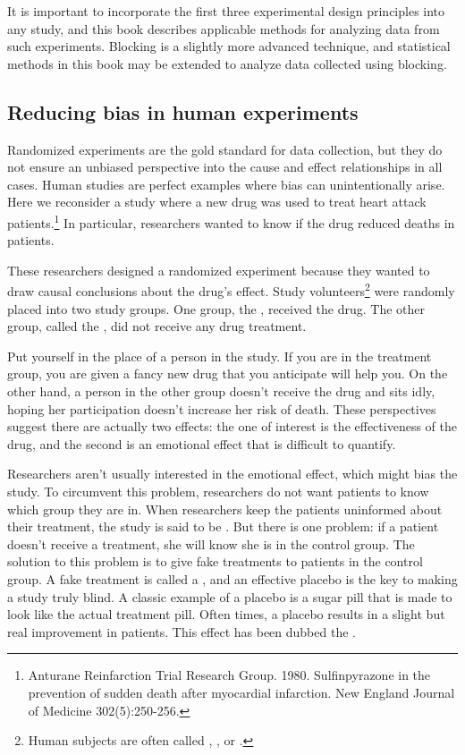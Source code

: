 It is important to incorporate the first three experimental design principles into any study, and this book describes applicable methods for analyzing data from such experiments. Blocking is a slightly more advanced technique, and statistical methods in this book may be extended to analyze data collected using blocking.

\subsection{Reducing bias in human experiments}
\label{biasInHumanExperiments}

Randomized experiments are the gold standard for data collection, but they do not ensure an unbiased perspective into the cause and effect relationships in all cases. Human studies are perfect examples where bias can unintentionally arise. Here we reconsider a study where a new drug was used to treat heart attack patients.\footnote{Anturane Reinfarction Trial Research Group. 1980. Sulfinpyrazone in the prevention of sudden death after myocardial infarction. New England Journal of Medicine 302(5):250-256.} In particular, researchers wanted to know if the drug reduced deaths in patients.

These researchers designed a randomized experiment because they wanted to draw causal conclusions about the drug's effect. Study volunteers\footnote{Human subjects are often called , , or .} were randomly placed into two study groups. One group, the , received the drug. The other group, called the , did not receive any drug treatment.

Put yourself in the place of a person in the study. If you are in the treatment group, you are given a fancy new drug that you anticipate will help you. On the other hand, a person in the other group doesn't receive the drug and sits idly, hoping her participation doesn't increase her risk of death. These perspectives suggest there are actually two effects: the one of interest is the effectiveness of the drug, and the second is an emotional effect that is difficult to quantify.

Researchers aren't usually interested in the emotional effect, which might bias the study. To circumvent this problem, researchers do not want patients to know which group they are in. When researchers keep the patients uninformed about their treatment, the study is said to be . But there is one problem: if a patient doesn't receive a treatment, she will know she is in the control group. The solution to this problem is to give fake treatments to patients in the control group. A fake treatment is called a , and an effective placebo is the key to making a study truly blind. A classic example of a placebo is a sugar pill that is made to look like the actual treatment pill. Often times, a placebo results in a slight but real improvement in patients. This effect has been dubbed the .

